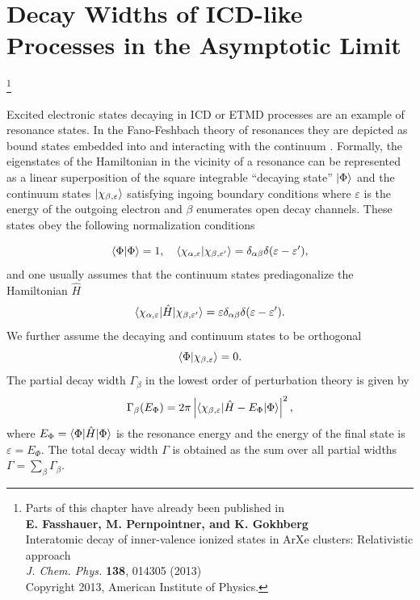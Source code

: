 \chapter{Decay Widths of ICD-like Processes in the Asymptotic Limit}
\label{chapter:asymptotic}
\let\thefootnote\relax\footnote{Parts of this chapter have already been
          published in\\
          \textbf{E. Fasshauer, M. Pernpointner, and K. Gokhberg}\\
          Interatomic decay of inner-valence ionized states in ArXe
          clusters: Relativistic approach\\
          \emph{J. Chem. Phys.} \textbf{138}, 014305 (2013)\\
          Copyright 2013, American Institute of Physics.}
\label{chapter:asymptotic}

Excited electronic states decaying in ICD or ETMD processes are an example
of resonance states. In the Fano-Feshbach theory of resonances they are
depicted as bound states embedded into and interacting with the
continuum \cite{Fano61,Feshbach58,Feshbach62}. Formally, the eigenstates
of the Hamiltonian in the vicinity of a resonance can be represented as a linear
superposition of the square integrable ``decaying state'' $\ket{\Phi}$ and
the continuum states $\ket{\chi_{\beta,\varepsilon}}$ satisfying ingoing
boundary conditions where $\varepsilon$ is the energy of the outgoing electron
and $\beta$ enumerates open decay channels. These states obey the following
normalization conditions

\begin{equation}
\braket{\Phi|\Phi}=1,\quad     
\braket{\chi_{\alpha,\varepsilon}|\chi_{\beta,\varepsilon^\prime}}=\delta_{\alpha\beta}
\delta(\varepsilon-\varepsilon^\prime),
\label{eq1}
\end{equation}
and one usually assumes that the continuum states prediagonalize the Hamiltonian $\hat{H}$
\begin{equation}
\braket{\chi_{\alpha,\varepsilon}|\hat{H}|\chi_{\beta,\varepsilon^\prime}}=\varepsilon\delta_{\alpha\beta}
\delta(\varepsilon -\varepsilon^\prime).
\label{eq2}
\end{equation}
We further assume the decaying and continuum states to be orthogonal
\begin{equation}
 \braket{\Phi|\chi_{\beta,\varepsilon}} = 0.
\end{equation}
The partial decay width $\Gamma_\beta$ in the lowest order of perturbation theory is given by \cite{Aaberg82}
\begin{equation}
\Gamma_\beta (E_\Phi) =2\pi\left |\braket{\chi_{\beta,\varepsilon}|\hat{H}-E_{\Phi}|\Phi}\right |^2,
\label{golden}
\end{equation}
where $E_{\Phi}=\braket{\Phi|\hat{H}|\Phi}$ is the resonance energy and
the energy of the final state is $\varepsilon = E_\Phi$. The total decay
width $\Gamma$ is obtained as the sum over all partial widths
$\Gamma = \sum\limits_{\beta} \Gamma_\beta$.

